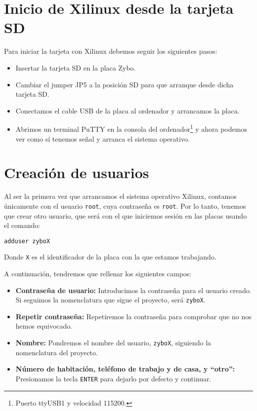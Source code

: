 \documentclass[12pt,letterpaper]{article}
\begin{document}
\section{Inicio de Xilinux desde la tarjeta SD}
Para iniciar la tarjeta con Xilinux debemos seguir los siguientes pasos:
\begin{itemize}
	\item Insertar la tarjeta SD en la placa Zybo.
	\item Cambiar el jumper JP5 a la posición SD para que arranque desde dicha tarjeta SD.
	\item Conectamos el cable USB de la placa al ordenador y arrancamos la placa.
	\item Abrimos un terminal PuTTY en la consola del ordenador\footnote{Puerto ttyUSB1 y velocidad 115200.} y ahora podemos ver como sí tenemos señal y arranca el sistema operativo.
\end{itemize}

\section{Creación de usuarios}
Al ser la primera vez que arrancamos el sistema operativo Xilinux, contamos únicamente con el usuario \texttt{root}, cuya contraseña es \texttt{root}. Por lo tanto, tenemos que crear otro usuario, que será con el que iniciemos sesión en las placas usando el comando:
\begin{center}
	\texttt{adduser zyboX}
\end{center}
Donde \texttt{X} es el identificador de la placa con la que estamos trabajando.

A continuación, tendremos que rellenar los siguientes campos:
\begin{itemize}
	\item \textbf{Contraseña de usuario:} Introducimos la contraseña para el usuario creado. Si seguimos la nomenclatura que sigue el proyecto, será \texttt{zyboX}.
	\item \textbf{Repetir contraseña:} Repetiremos la contraseña para comprobar que no nos hemos equivocado.
	\item \textbf{Nombre:} Pondremos el nombre del usuario, \texttt{zyboX}, siguiendo la nomenclatura del proyecto.
	\item \textbf{Número de habitación, teléfono de trabajo y de casa, y ``otro'':} Presionamos la tecla \texttt{ENTER} para dejarlo por defecto y continuar.
\end{itemize}
\end{document}
